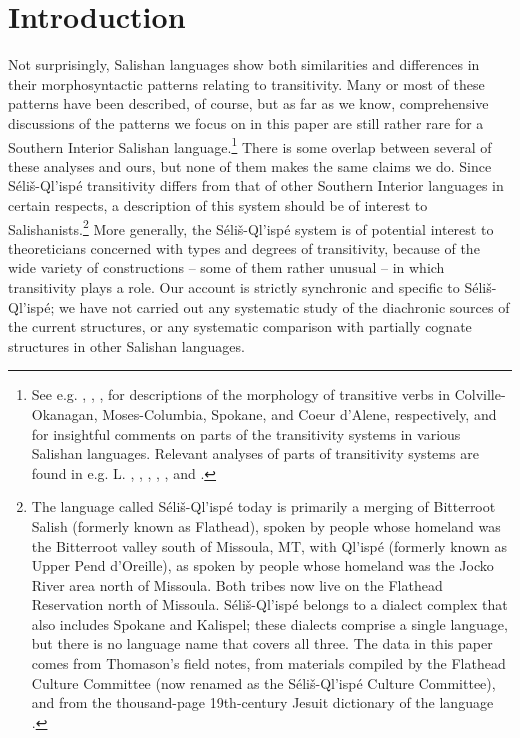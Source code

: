 \documentclass[output=paper,colorlinks,citecolor=brown]{langscibook}
\begin{document}
\section{Introduction}
\label{thomason_section_1}
  Not surprisingly, Salishan languages show both similarities and
  differences in their morphosyntactic patterns relating to
  transitivity.  Many or most of these patterns have been described,
  of course, but as far as we know, comprehensive discussions of the
  patterns we focus on in this paper are still rather rare for a
  Southern Interior Salishan language.\footnote{See e.g.
  , , ,
   for descriptions of
  the morphology of transitive verbs in Colville-Okanagan,
  Moses-Columbia, Spokane, and Coeur d'Alene, respectively, and
   for insightful comments on parts of the transitivity
  systems in various Salishan languages.  Relevant analyses of parts
  of transitivity systems are found in e.g. L. ,
  , , ,
  , and .}
  There is some overlap between several of these analyses and ours,
  but none of them makes the same claims we do.  Since
  S\'eli\v{s}-Ql'isp\'e transitivity differs from that of other
  Southern Interior languages in certain respects, a description of
  this system should be of interest to Salishanists.\footnote{The
  language called S\'eli\v{s}-Ql'isp\'e today is primarily a merging
  of Bitterroot Salish (formerly known as Flathead), spoken by people
  whose homeland was the Bitterroot valley south of Missoula, MT,
  with Ql'isp\'e (formerly known as Upper Pend d'Oreille), as spoken
  by people whose homeland was the Jocko River area north of
  Missoula.  Both tribes now live on the Flathead Reservation north
  of Missoula.  S\'eli\v{s}-Ql'isp\'e belongs to a dialect complex
  that also includes Spokane and Kalispel; these dialects comprise a
  single language, but there is no language name that covers all
  three.  The data in this paper comes from Thomason's field notes,
  from materials compiled by the Flathead Culture Committee (now
  renamed as the S\'eli\v{s}-Ql'isp\'e Culture Committee), and from
  the thousand-page 19th-century Jesuit dictionary of the language
  \citep{Mengarinietal.:1877}.}  More generally, the
  S\'eli\v{s}-Ql'isp\'e system is of potential interest to
  theoreticians concerned with types and degrees of transitivity,
  because of the wide variety of constructions -- some of them
  rather unusual -- in which transitivity plays a role.  Our account
  is strictly synchronic and specific to S\'eli\v{s}-Ql'isp\'e; we
  have not carried out any systematic study of the diachronic sources
  of the current structures, or any systematic comparison with
  partially cognate structures in other Salishan languages.
\end{document}
